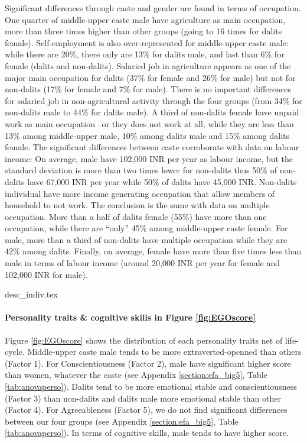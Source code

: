\documentclass[a4paper, 11pt, onecolumn]{article}
\begin{document}
Significant differences through caste and gender are found in terms of occupation.
One quarter of middle-upper caste male have agriculture as main occupation, more than three times higher than other groups (going to 16 times for dalits female).
Self-employment is also over-represented for middle-upper caste male: while there are 20\%, there only are 13\% for dalits male, and last than 6\% for female (dalits and non-dalits).
Salaried job in agriculture appears as one of the major main occupation for dalits (37\% for female and 26\% for male) but not for non-dalits (17\% for female and 7\% for male).
There is no important differences for salaried job in non-agricultural activity through the four groups (from 34\% for non-dalits male to 44\% for dalits male).
A third of non-dalits female have unpaid work as main occupation --or they does not work at all, while they are less than 13\% among middle-upper male, 10\% among dalits male and 15\% among dalits female.
The significant differences between caste corroborate with data on labour income:
On average, male have 102,000 INR per year as labour income, but the standard deviation is more than two times lower for non-dalits thus 50\% of non-dalits have 67,000 INR per year while 50\% of dalits have 45,000 INR.
Non-dalits individual have more income generating occupation that allow members of household to not work. 
The conclusion is the same with data on multiple occupation.
More than a half of dalits female (55\%) have more than one occupation, while there are ``only'' 45\% among middle-upper caste female.
For male, more than a third of non-dalits have multiple occupation while they are 42\% among dalits.
Finally, on average, female have more than five times less than male in terms of labour income (around 20,000 INR per year for female and 102,000 INR for male).

{desc_indiv.tex}

\paragraph{Personality traits \& cognitive skills in Figure \ref{fig:EGOscore}}

Figure \ref{fig:EGOscore} shows the distribution of each personality traits net of life-cycle.
Middle-upper caste male tends to be more extraverted-openned than others (Factor 1).
For Conscientiousness (Factor 2), male have significant higher score than women, whatever the caste (see Appendix \ref{section:efa_big5}, Table \ref{tab:anovaperso}).
Dalits tend to be more emotional stable and conscientiousness (Factor 3) than non-dalits
and dalits male more emotional stable than other (Factor 4).
For Agreeableness (Factor 5), we do not find significant differences between our four groups (see Appendix \ref{section:efa_big5}, Table \ref{tab:anovaperso}).
In terms of cognitive skills, male tends to have higher score.
\end{document}
